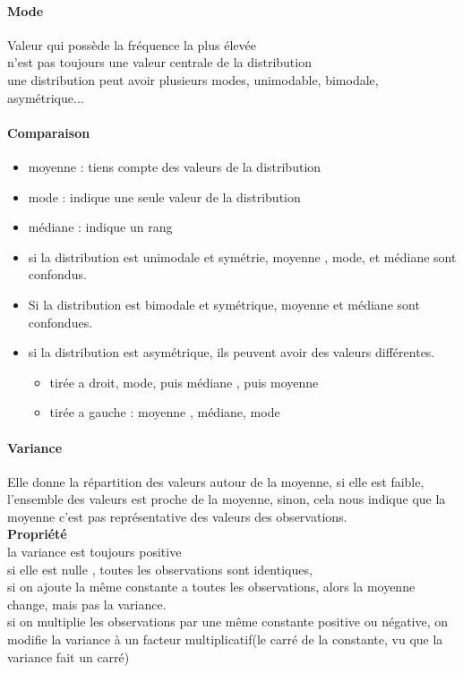 \documentclass{article}
\begin{document}
\paragraph{Mode}
Valeur qui possède la fréquence la plus élevée\\n'est pas toujours une valeur centrale de la distribution\\une distribution peut avoir plusieurs modes, unimodable, bimodale, asymétrique...
\paragraph{Comparaison}
\begin{itemize}
\item moyenne : tiens compte des valeurs de la distribution
\item mode : indique une seule valeur de la distribution
\item médiane : indique un rang
\item si la distribution est unimodale et symétrie, moyenne , mode, et médiane sont confondus.
\item Si la distribution est bimodale et symétrique, moyenne et médiane sont confondues.
\item si la distribution est asymétrique, ils peuvent avoir des valeurs différentes.
\begin{itemize}
\item tirée a droit, mode, puis médiane , puis moyenne
\item tirée a gauche : moyenne , médiane, mode
\end{itemize}
\end{itemize}
\paragraph{Variance}
Elle donne la répartition des valeurs autour de la moyenne, si elle est faible, l'ensemble des valeurs est proche de la moyenne, sinon, cela nous indique que la moyenne c'est pas représentative des valeurs des observations.\\\textbf{Propriété}\\la variance est toujours positive\\ si elle est nulle , toutes les observations sont identiques,\\si on ajoute la même constante a toutes les observations, alors la moyenne change, mais pas la variance.\\si on multiplie les observations par une même constante positive ou négative, on modifie la variance à un facteur multiplicatif(le carré de la constante, vu que la variance fait un carré)
\end{document}
